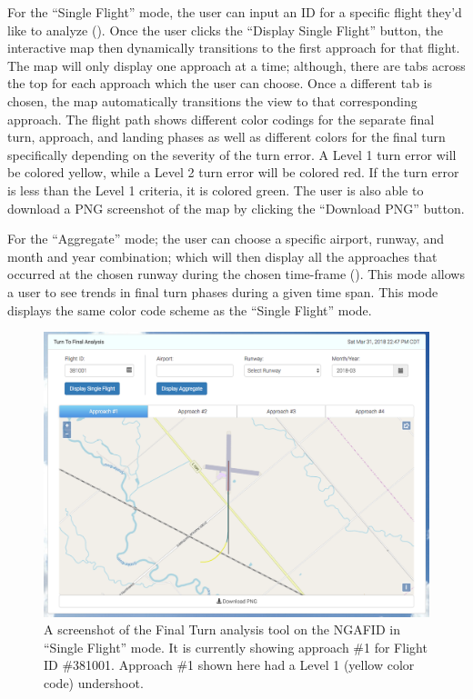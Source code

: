     	For the ``Single Flight'' mode, the user can input an ID for a specific flight they'd like to analyze ().  Once the user clicks the ``Display Single Flight'' button, the interactive map then dynamically transitions to the first approach for that flight.  The map will only display one approach at a time; although, there are tabs across the top for each approach which the user can choose.  Once a different tab is chosen, the map automatically transitions the view to that corresponding approach.  The flight path shows different color codings for the separate final turn, approach, and landing phases as well as different colors for the final turn specifically depending on the severity of the turn error.  A Level 1 turn error will be colored yellow, while a Level 2 turn error will be colored red.  If the turn error is less than the Level 1 criteria, it is colored green.  The user is also able to download a PNG screenshot of the map by clicking the ``Download PNG'' button.
        
        For the ``Aggregate'' mode; the user can choose a specific airport, runway, and month and year combination; which will then display all the approaches that occurred at the chosen runway during the chosen time-frame ().  This mode allows a user to see trends in final turn phases during a given time span.  This mode displays the same color code scheme as the ``Single Flight'' mode.
    
    	\begin{figure}
    		\centering
            \includegraphics[width=\linewidth]{img/single_ttf_screenshot}
            \caption{A screenshot of the Final Turn analysis tool on the NGAFID in ``Single Flight'' mode.  It is currently showing approach \#1 for Flight ID \#381001.  Approach \#1 shown here had a Level 1 (yellow color code) undershoot.}
            \label{fig:single_ttf_screenshot}
    	\end{figure}
        
